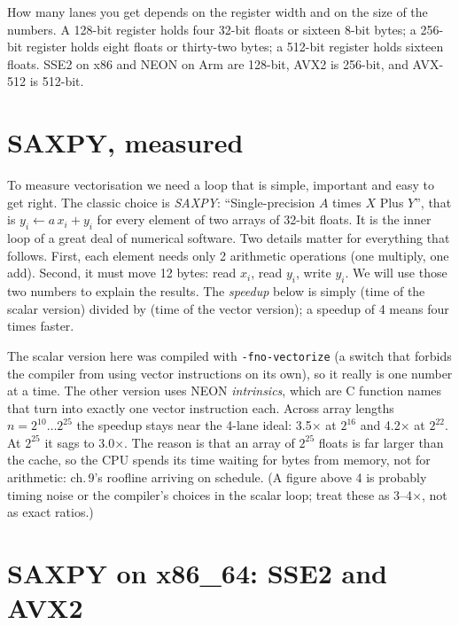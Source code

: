 How many lanes you get depends on the register width and on the size of
the numbers. A 128-bit register holds four 32-bit floats or sixteen
8-bit bytes; a 256-bit register holds eight floats or thirty-two bytes;
a 512-bit register holds sixteen floats. SSE2 on x86 and NEON on Arm
are 128-bit, AVX2 is 256-bit, and AVX-512 is 512-bit.


\section{SAXPY, measured}

To measure vectorisation we need a loop that is simple, important and
easy to get right. The classic choice is \emph{SAXPY}: ``Single-precision
$A$ times $X$ Plus $Y$'', that is $y_i \leftarrow a\,x_i + y_i$ for every
element of two arrays of 32-bit floats. It is the inner loop of a great
deal of numerical software. Two details matter for everything that
follows. First, each element needs only 2 arithmetic operations (one
multiply, one add). Second, it must move 12 bytes: read $x_i$, read
$y_i$, write $y_i$. We will use those two numbers to explain the results.
The \emph{speedup} below is simply (time of the scalar version) divided
by (time of the vector version); a speedup of 4 means four times faster.


\begin{example}
The scalar version here was compiled with \texttt{-fno-vectorize}
(a switch that forbids the compiler from using vector instructions
on its own), so it really is one number at a time. The other version
uses NEON \emph{intrinsics}, which are C function names that turn into
exactly one vector instruction each. Across array lengths
$n=2^{10}\dots2^{25}$ the speedup stays near the 4-lane ideal:
3.5$\times$ at $2^{16}$ and 4.2$\times$ at $2^{22}$. At $2^{25}$ it
sags to 3.0$\times$. The reason is that an array of $2^{25}$ floats is
far larger than the cache, so the CPU spends its time waiting for bytes
from memory, not for arithmetic: ch.\,9's roofline arriving on schedule.
(A figure above 4 is probably timing noise or the compiler's choices in
the scalar loop; treat these as 3--4$\times$, not as exact ratios.)
\end{example}

\section{SAXPY on x86\_64: SSE2 and AVX2}


